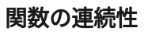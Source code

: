 \documentclass[../../imaging-math]{subfiles}
\begin{document}
\section{関数の連続性}

\wip
\end{document}

